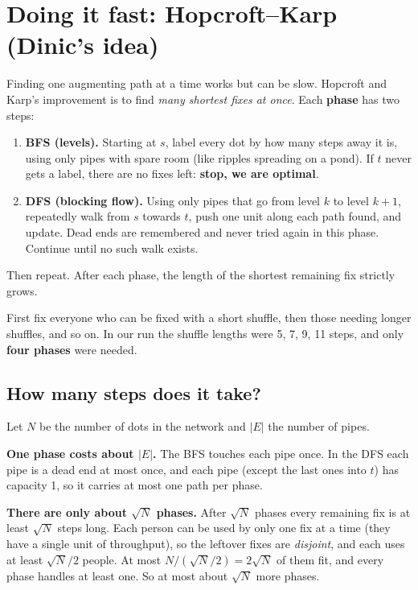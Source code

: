 \documentclass[11pt]{article}
\begin{document}
\section{Doing it fast: Hopcroft--Karp (Dinic's idea)}\label{sec:fast}

Finding one augmenting path at a time works but can be slow. Hopcroft and Karp's improvement is to find \emph{many shortest fixes at once}. Each \textbf{phase} has two steps:

\begin{enumerate}
 \item \textbf{BFS (levels).} Starting at $s$, label every dot by how many steps away it is, using only pipes with spare room (like ripples spreading on a pond). If $t$ never gets a label, there are no fixes left: \textbf{stop, we are optimal}.
 \item \textbf{DFS (blocking flow).} Using only pipes that go from level $k$ to level $k{+}1$, repeatedly walk from $s$ towards $t$, push one unit along each path found, and update. Dead ends are remembered and never tried again in this phase. Continue until no such walk exists.
\end{enumerate}

Then repeat. After each phase, the length of the shortest remaining fix strictly grows.

\begin{plain}
First fix everyone who can be fixed with a short shuffle, then those needing longer shuffles, and so on. In our run the shuffle lengths were 5, 7, 9, 11 steps, and only \textbf{four phases} were needed.
\end{plain}

\subsection{How many steps does it take?}

Let $N$ be the number of dots in the network and $|E|$ the number of pipes.

\textbf{One phase costs about $|E|$.} The BFS touches each pipe once. In the DFS each pipe is a dead end at most once, and each pipe (except the last ones into $t$) has capacity 1, so it carries at most one path per phase.

\textbf{There are only about $\sqrt N$ phases.} After $\sqrt N$ phases every remaining fix is at least $\sqrt N$ steps long. Each person can be used by only one fix at a time (they have a single unit of throughput), so the leftover fixes are \emph{disjoint}, and each uses at least $\sqrt N/2$ people. At most $N/(\sqrt N/2)=2\sqrt N$ of them fit, and every phase handles at least one. So at most about $\sqrt N$ more phases.
\end{document}

